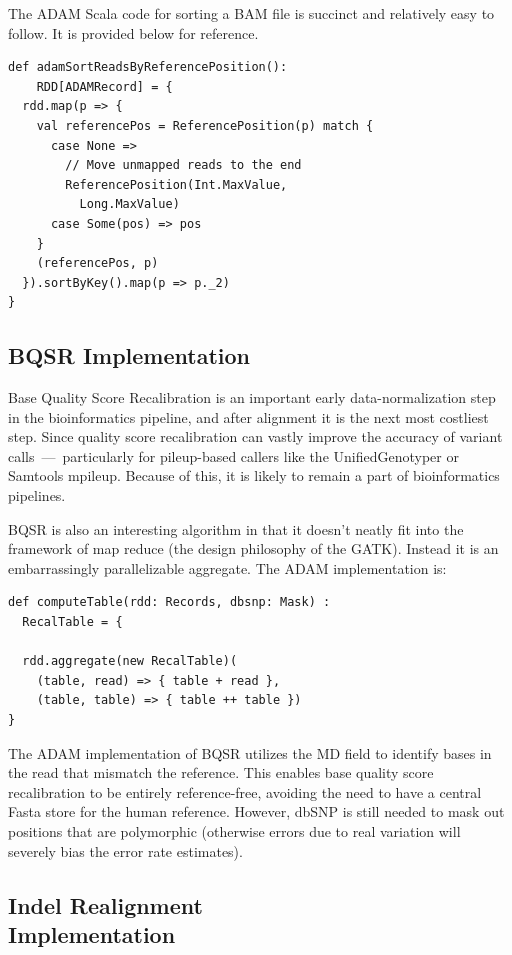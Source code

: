 \documentclass[10pt,twocolumn]{article}
\theoremstyle{plain}
\begin{document}
The ADAM Scala code for sorting a BAM file is succinct and relatively 
easy to follow. It is provided below for reference.

\begin{lstlisting}
def adamSortReadsByReferencePosition():
    RDD[ADAMRecord] = {
  rdd.map(p => {
    val referencePos = ReferencePosition(p) match {
      case None =>
        // Move unmapped reads to the end
        ReferencePosition(Int.MaxValue,
          Long.MaxValue)
      case Some(pos) => pos
    }
    (referencePos, p)
  }).sortByKey().map(p => p._2)
}
\end{lstlisting}

\subsection{BQSR Implementation}
\label{sec:bqsr-implementation}

Base Quality Score Recalibration is an important early data-normalization step in the bioinformatics pipeline, and after alignment
it is the next most costliest step. Since quality score recalibration can vastly improve the accuracy of variant calls~---~particularly for
pileup-based callers like the UnifiedGenotyper or Samtools mpileup. Because of this, it is likely to remain a part of bioinformatics pipelines.

BQSR is also an interesting algorithm in that it doesn't neatly fit into the framework of map reduce (the design philosophy of the GATK).
Instead it is an embarrassingly parallelizable aggregate. The ADAM implementation is:

\begin{lstlisting}
def computeTable(rdd: Records, dbsnp: Mask) :
  RecalTable = {
  
  rdd.aggregate(new RecalTable)(
    (table, read) => { table + read },
    (table, table) => { table ++ table })
}
\end{lstlisting}

The ADAM implementation of BQSR utilizes the MD field to identify bases in the read that mismatch the reference. This enables
base quality score recalibration to be entirely reference-free, avoiding the need to have a central Fasta store for the human
reference. However, dbSNP is still needed to mask out positions that are polymorphic (otherwise errors due to real variation will
severely bias the error rate estimates).

\subsection{Indel Realignment\\Implementation}
\label{sec:indel-realignment-implementation}
\end{document}
